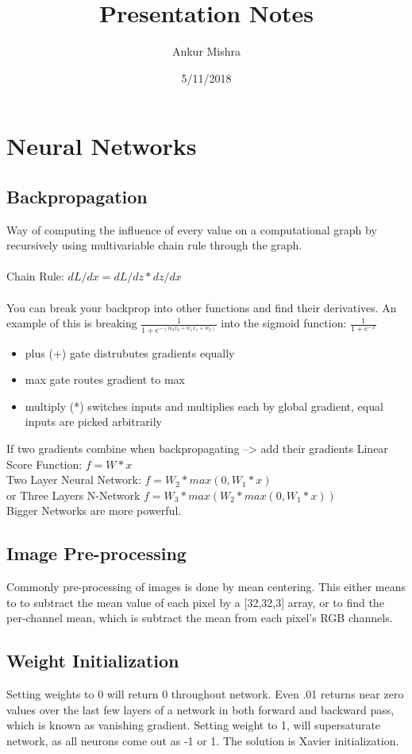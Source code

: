 \documentclass[11pt]{article}
\author{Ankur Mishra}
\date{5/11/2018}
\title{Presentation Notes}
\begin{document}
\maketitle
\tableofcontents

\section{Neural Networks}
\label{sec-1}
\subsection{Backpropagation}
\label{sec-1-1}
Way of computing the influence of every value on a computational graph by recursively using multivariable chain 
rule through the graph. \\ \\
Chain Rule: $dL/dx = dL/dz * dz/dx$ \\ \\
You can break your backprop into other functions and find their derivatives. An example of this is breaking 
$\frac{1}{1+e^{-(w_0x_0+w_1x_1+w_2)}}$ into the sigmoid function: $\frac{1}{1+e^{-x}}$
\begin{itemize}
\item plus (+) gate distrubutes gradients equally
\item max gate routes gradient to max
\item multiply (*) switches inputs and multiplies each by global gradient, equal inputs are picked arbitrarily
\end{itemize}
If two gradients combine when backpropagating --> add their gradients
Linear Score Function: $f = W*x$ \\
Two Layer Neural Network: $f = W_2 *max(0,W_1*x)$ \\ or Three Layers N-Network $f = W_3*max(W_2*max(0,W_1*x))$ \\
Bigger Networks are more powerful.\\
\subsection{Image Pre-processing}
\label{sec-1-2}
Commonly pre-processing of images is done by mean centering. This either means to to subtract the mean
value of each pixel by a [32,32,3] array, or to find the per-channel mean, which is subtract the mean from each
pixel's RGB channels.
\subsection{Weight Initialization}
\label{sec-1-3}
Setting weights to 0 will return 0 throughout network. Even .01 returns near zero values over the last few 
layers of a network in both forward and backward pass, which is known as vanishing gradient. Setting weight to 1, will supersaturate network, as all neurons come out as -1 or 1. The solution is Xavier initialization.
\end{document}
